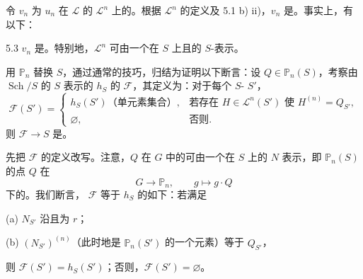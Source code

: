 令 $v_n$ 为 $u_n$ 在 $\mathscr L$ 的 $\mathscr L^n$ 上的。根据 $\mathscr L^n$ 的定义及 5.1 b) ii)，$v_n$ 是。事实上，有以下：
\begin{SGAresult}{}{5.3}
 $v_n$ 是。特别地，$\mathscr L^n$ 可由一个在 $S$ 上且的 $S$-表示。
\end{SGAresult}
用 $\mathbb P_n$ 替换 $S$，通过通常的技巧，归结为证明以下断言：设 $Q\in\mathbb P_n(S)$，考察由 $\operatorname{Sch}/S$ 的 $S$ 表示的 $h_S$ 的 $\mathscr F$，其定义为：对于每个 $S$- $S'$，
\[\mathscr F(S')=\begin{cases}
h_S(S')\text{（单元素集合）},&\text{若存在 }H\in\mathscr L^n(S')\text{ 使 }H^{(n)}=Q_{S'},\\
\varnothing,&\text{否则}.
\end{cases}\]
则 $\mathscr F\to S$ 是。

先把 $\mathscr F$ 的定义改写。注意，$Q$ 在 $G$ 中的可由一个在 $S$ 上的 $N$ 表示，即 $\mathbb P_n(S)$ 的点 $Q$ 在
\[G\longrightarrow\mathbb P_n,\qquad g\longmapsto g\cdot Q\]
下的。我们断言， $\mathscr F$ 等于 $h_S$ 的如下：若满足

(a) $N_{S'}$ 沿且为 $r$；

(b) $(N_{S'})^{(n)}$（此时地是 $\mathbb P_n(S')$ 的一个元素）等于 $Q_{S'}$，

则 $\mathscr F(S')=h_S(S')$；否则，$\mathscr F(S')=\varnothing$。

